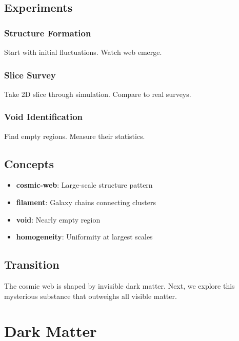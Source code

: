\documentclass[
  11pt,
  letterpaper,
  twoside,
  openright]{book}
\providecommand{\tightlist}{%
  \setlength{\itemsep}{0pt}\setlength{\parskip}{0pt}}
\begin{document}
\section{Experiments}\label{experiments-28}

\subsection{Structure Formation}\label{structure-formation}

Start with initial fluctuations. Watch web emerge.

\subsection{Slice Survey}\label{slice-survey}

Take 2D slice through simulation. Compare to real surveys.

\subsection{Void Identification}\label{void-identification}

Find empty regions. Measure their statistics.

\section{Concepts}\label{concepts-28}

\begin{itemize}
\tightlist
\item
  \textbf{cosmic-web}: Large-scale structure pattern
\item
  \textbf{filament}: Galaxy chains connecting clusters
\item
  \textbf{void}: Nearly empty region
\item
  \textbf{homogeneity}: Uniformity at largest scales
\end{itemize}

\section{Transition}\label{transition-28}

The cosmic web is shaped by invisible dark matter. Next, we explore this
mysterious substance that outweighs all visible matter.

\chapter{Dark Matter}\label{sec-dark-matter}
\end{document}
